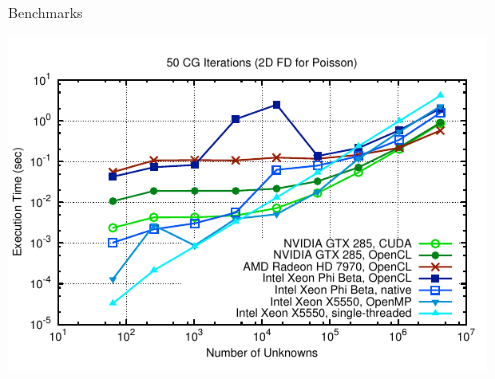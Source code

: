 

\begin{frame}{Benchmarks}
  \begin{center}
   \includegraphics[width=0.95\textwidth]{figures/cg-timings-7}
  \end{center}
\end{frame}

